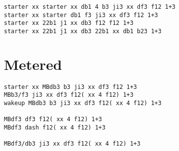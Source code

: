 \documentclass[main.tex]{subfiles}
\begin{document}
\begin{lstlisting}[language=FG]
starter xx starter xx db1 4 b3 ji3 xx df3 f12 1+3
starter xx starter db1 f3 ji3 xx df3 f12 1+3
starter xx 22b1 j1 xx db3 f12 f12 1+3
starter xx 22b1 j1 xx db3 22b1 xx db1 b23 1+3
\end{lstlisting}




\section{Metered}


\begin{lstlisting}[language=FG]
starter xx MBdb3 b3 ji3 xx df3 f12 1+3
MBb3/f3 ji3 xx df3 f12( xx 4 f12) 1+3
wakeup MBdb3 b3 ji3 xx df3 f12( xx 4 f12) 1+3

MBdf3 df3 f12( xx 4 f12) 1+3
MBdf3 dash f12( xx 4 f12) 1+3

MBdf3/db3 ji3 xx df3 f12( xx 4 f12) 1+3
\end{lstlisting}






\end{document}
